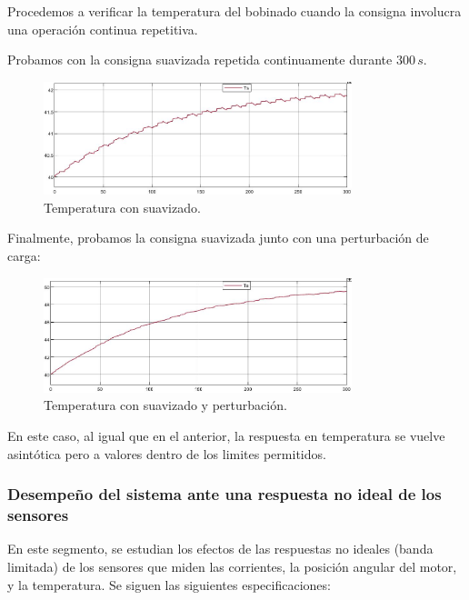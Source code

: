 \documentclass{article}
\begin{document}
Procedemos a verificar la temperatura del bobinado cuando la consigna involucra una operación 
continua repetitiva.

Probamos con la consigna suavizada repetida continuamente durante $300\,s$.
    
\begin{figure}[H]
    \centering
    \includegraphics[width=0.8\textwidth]{5.2.5.1.c.2.png}
    \caption{Temperatura con suavizado.}
\end{figure}

Finalmente, probamos la consigna suavizada junto con una perturbación de carga:

\begin{figure}[H]
    \centering
    \includegraphics[width=0.8\textwidth]{5.2.5.1.c.3.png}
    \caption{Temperatura con suavizado y perturbación.}
\end{figure}
    
En este caso, al igual que en el anterior, la respuesta en temperatura se vuelve asintótica pero 
a valores dentro de los limites permitidos.


\subsubsection{Desempeño del sistema ante una respuesta no ideal de los sensores}

En este segmento, se estudian los efectos de las respuestas no ideales (banda limitada) de los 
sensores que miden las corrientes, la posición angular del motor, y la temperatura. Se siguen las 
siguientes especificaciones:
\end{document}
